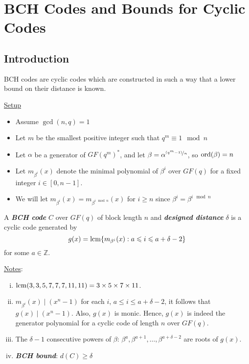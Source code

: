\chapter{BCH Codes and Bounds for Cyclic Codes}
\section{Introduction}
BCH codes are cyclic codes which are constructed in such a way that
a lower bound on their distance is known.

\underline{Setup}

\begin{itemize}
    \item Assume $ \gcd(n,q)=1 $
    \item Let $ m $ be the smallest positive integer such that $ q^m\equiv 1\mod n $
    \item Let $ \alpha $ be a generator of $ GF(q^m)^* $, and let
          $ \beta=\alpha^{\nicefrac{(q^m-1)}{n}} $, so $ \operatorname{ord}(\beta)=n $
    \item Let $ m_{\beta^i}(x) $ denote the minimal polynomial of
          $ \beta^i $ over $ GF(q) $ for a fixed integer $ i\in[0,n-1] $.
    \item We will let $ m_{\beta^i}(x)=m_{\beta^{i\mod n}}(x) $
          for $ i\geqslant n $ since $ \beta^i=\beta^{i\mod n} $
\end{itemize}

\begin{defbox}
    \begin{definition}
        A \textbf{\emph{BCH code}} $ C $ over $ GF(q) $ of block
        length $ n $ and \textbf{\emph{designed distance}} $ \delta $
        is a cyclic code generated by
        \[ g(x)=\operatorname{lcm} \{m_{\beta^i}(x):a\leqslant i\leqslant a+\delta-2\} \]
        for some $ a\in\mathbb{Z} $.
    \end{definition}
\end{defbox}

\underline{Notes}:
\begin{enumerate}[(i)]
    \item $ \operatorname{lcm}(3,3,5,7,7,7,11,11)=3\times 5\times 7\times 11 $.
    \item $ m_{\beta^i}(x)\mid (x^n-1) $ for each $ i $,
          $ a\leqslant i\leqslant a+\delta-2 $, it follows that $ g(x)\mid (x^n-1) $.
          Also, $ g(x) $ is monic. Hence, $ g(x) $ is indeed the generator polynomial
          for a cyclic code of length $ n $ over $ GF(q) $.
    \item The $ \delta-1 $ consecutive powers of $ \beta $:
          $ \beta^a,\beta^{a+1},\ldots ,\beta^{a+\delta-2} $
          are roots of $ g(x) $.
    \item \textbf{\emph{BCH bound}}: $ d(C)\geqslant \delta $
\end{enumerate}

